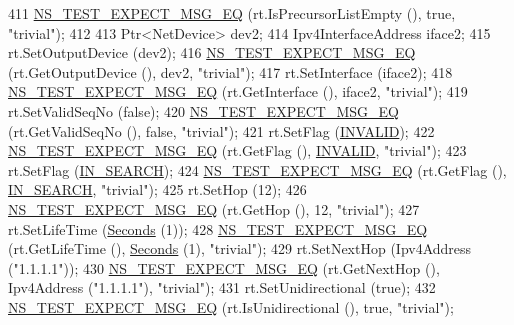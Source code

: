\begin{DoxyCode}
411     \hyperlink{group__testing_ga7304ba46a28d8cf08dfdfd6499cf7068}{NS\_TEST\_EXPECT\_MSG\_EQ} (rt.IsPrecursorListEmpty (), \textcolor{keyword}{true}, \textcolor{stringliteral}{"trivial"});
412 
413     Ptr<NetDevice> dev2;
414     Ipv4InterfaceAddress iface2;
415     rt.SetOutputDevice (dev2);
416     \hyperlink{group__testing_ga7304ba46a28d8cf08dfdfd6499cf7068}{NS\_TEST\_EXPECT\_MSG\_EQ} (rt.GetOutputDevice (), dev2, \textcolor{stringliteral}{"trivial"});
417     rt.SetInterface (iface2);
418     \hyperlink{group__testing_ga7304ba46a28d8cf08dfdfd6499cf7068}{NS\_TEST\_EXPECT\_MSG\_EQ} (rt.GetInterface (), iface2, \textcolor{stringliteral}{"trivial"});
419     rt.SetValidSeqNo (\textcolor{keyword}{false});
420     \hyperlink{group__testing_ga7304ba46a28d8cf08dfdfd6499cf7068}{NS\_TEST\_EXPECT\_MSG\_EQ} (rt.GetValidSeqNo (), \textcolor{keyword}{false}, \textcolor{stringliteral}{"trivial"});
421     rt.SetFlag (\hyperlink{group__aodv_gga44216921a9c725a5ab8bc19059052a26a0d7b8118b2af9344a91683148f1261c3}{INVALID});
422     \hyperlink{group__testing_ga7304ba46a28d8cf08dfdfd6499cf7068}{NS\_TEST\_EXPECT\_MSG\_EQ} (rt.GetFlag (), \hyperlink{group__aodv_gga44216921a9c725a5ab8bc19059052a26a0d7b8118b2af9344a91683148f1261c3}{INVALID}, \textcolor{stringliteral}{"trivial"});
423     rt.SetFlag (\hyperlink{group__aodv_gga44216921a9c725a5ab8bc19059052a26aba44cda5a5df371b6567f70d7d8311fa}{IN\_SEARCH});
424     \hyperlink{group__testing_ga7304ba46a28d8cf08dfdfd6499cf7068}{NS\_TEST\_EXPECT\_MSG\_EQ} (rt.GetFlag (), \hyperlink{group__aodv_gga44216921a9c725a5ab8bc19059052a26aba44cda5a5df371b6567f70d7d8311fa}{IN\_SEARCH}, \textcolor{stringliteral}{"trivial"});
425     rt.SetHop (12);
426     \hyperlink{group__testing_ga7304ba46a28d8cf08dfdfd6499cf7068}{NS\_TEST\_EXPECT\_MSG\_EQ} (rt.GetHop (), 12, \textcolor{stringliteral}{"trivial"});
427     rt.SetLifeTime (\hyperlink{group__timecivil_ga33c34b816f8ff6628e33d5c8e9713b9e}{Seconds} (1));
428     \hyperlink{group__testing_ga7304ba46a28d8cf08dfdfd6499cf7068}{NS\_TEST\_EXPECT\_MSG\_EQ} (rt.GetLifeTime (), \hyperlink{group__timecivil_ga33c34b816f8ff6628e33d5c8e9713b9e}{Seconds} (1), \textcolor{stringliteral}{"trivial"});
429     rt.SetNextHop (Ipv4Address (\textcolor{stringliteral}{"1.1.1.1"}));
430     \hyperlink{group__testing_ga7304ba46a28d8cf08dfdfd6499cf7068}{NS\_TEST\_EXPECT\_MSG\_EQ} (rt.GetNextHop (), Ipv4Address (\textcolor{stringliteral}{"1.1.1.1"}), \textcolor{stringliteral}{"trivial"});
431     rt.SetUnidirectional (\textcolor{keyword}{true});
432     \hyperlink{group__testing_ga7304ba46a28d8cf08dfdfd6499cf7068}{NS\_TEST\_EXPECT\_MSG\_EQ} (rt.IsUnidirectional (), \textcolor{keyword}{true}, \textcolor{stringliteral}{"trivial"});

\end{DoxyCode}
